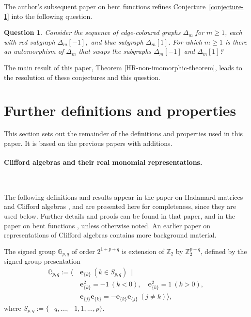 \documentclass[12pt,a4paper]{article}
\newcommand{\mb}[1]{\mathbb{#1}}
\newcommand{\mf}[1]{\mathbf{#1}}
\newcommand{\G}{\mb{G}}
\newcommand{\Z}{\mb{Z}}
\newcommand{\Rep}{P}
\newtheorem{Question}{Question}
\begin{document}
The author's subsequent paper on bent functions \cite{Leo15Twin}
refines Conjecture~\ref{conjecture-1} into the following question.
\begin{Question}
\label{Question-1}
Consider the sequence of edge-coloured graphs $\varDelta_m$ for $m \geqslant 1$,
each with red subgraph $\varDelta_m[-1],$ and blue subgraph $\varDelta_m[1].$
For which $m \geqslant 1$ is there an automorphism of $\varDelta_m$
that swaps the subgraphs $\varDelta_m[-1]$ and $\varDelta_m[1]$?
\end{Question}

The main result of this paper, Theorem \ref{HR-non-imomorphic-theorem},
leads to the resolution of these conjectures and this question.

\section{Further definitions and properties}
\label{sec-Preliminaries}
This section sets out the remainder of the definitions and properties used in this paper.
It is based on the previous papers \cite{Leo14Constructions, Leo15Twin} with additions.

\paragraph*{Clifford algebras and their real monomial representations.}
\label{sec-Clifford}

~

The following definitions and results appear in the paper on Hada\-mard matrices and Clifford algebras \cite{Leo14Constructions},
and are presented here for completeness, since they are used below.
Further details and proofs can be found in that paper, and in the paper on bent functions \cite{Leo15Twin},
unless otherwise noted.
An earlier paper on representations of Clifford algebras \cite{Leo05} contains more background material.

The signed group \cite{Cra95}
$\G_{p,q}$ of order $2^{1+p+q}$
is extension of $\Z_2$ by $\Z_2^{p+q}$,
defined by the signed group presentation
%
\begin{align*}
\G_{p,q} := \bigg\langle \
&\mf{e}_{\{k\}}\ (k \in S_{p,q})\ \mid
\\
&\mf{e}_{\{k\}}^2 = -1\ (k < 0), \quad \mf{e}_{\{k\}}^2 = 1\ (k > 0),
\\
&\mf{e}_{\{j\}}\mf{e}_{\{k\}} = -\mf{e}_{\{k\}}\mf{e}_{\{j\}}\ (j \neq k) \bigg\rangle,
\end{align*}
%
where $S_{p,q} := \{-q,\ldots,-1,1,\ldots,p\}.$
%
\end{document}

